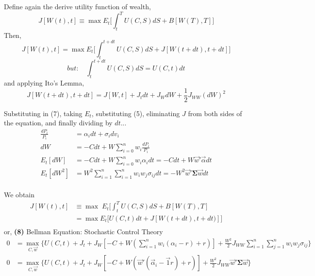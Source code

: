 \documentclass[
14pt,notheorems,hyperref={pdfauthor=whatever}
]{beamer}
\begin{document}
\begin{frame}
Define again the derive utility function of wealth,
\begin{equation} \tag{6}
    J[W(t),t] \equiv \max E_t \Bigg[ \int_t^T U(C,S)dS + B[W(T),T] \Bigg]
\end{equation}
Then,
\begin{equation} \tag{7}
    J[W(t),t] = \max E_t \Bigg[ \int_t^{t+dt} U(C,S)dS + J[W(t+dt),t+dt] \Bigg]
\end{equation}
\[\textit{but:}\;\;\;\; \int_t^{t+dt} U(C,S)dS = U(C,t)dt\]
and applying Ito's Lemma,
\[ J[W(t+dt),t+dt] = J[W,t] + J_tdt + J_WdW + \frac{1}{2} J_{WW}(dW)^2\]
\end{frame}

\begin{frame}
Substituting in (7), taking $E_t$, substituting (5), eliminating $J$ from both sides of the equation, and finally dividing by $dt$...\\
\begin{align*}
    \frac{dP_i}{P_i} &= \alpha_i dt + \sigma_i dv_i\\
    dW &= -C dt + W\sum_{i=0}^n w_i \frac{dP_i}{P_i}\\
    E_t[dW] &= -C dt + W \sum_{i=0}^n w_i\alpha_i dt = -C dt + W \vec{w}'\vec{\alpha} dt\\
    E_t[dW^2] &= W^2 \sum_{i=1}^n \sum_{i=1}^n w_i w_j \sigma_{ij} dt = -W^2 \vec{w}'\bm{\Sigma}\vec{w} dt\\
\end{align*}
\end{frame}

\begin{frame}
We obtain
\begin{align*}
    J[W(t),t] &\equiv \max\;E_t \Bigg[ \int_t^T U(C,S)dS + B[W(T),T]\\
    &= \max E_t \Bigg[U(C,t)dt + J[W(t+dt),t+dt)]\Bigg]\\
\end{align*}
or, \textbf{(8)} Bellman Equation: Stochastic Control Theory\\
\begin{align*}
    0 &= \max_{C,\vec{w}} \Bigg\{ U(C,t)+J_t+J_W[-C+W(\sum_{i=1}^n w_i(\alpha_i-r)+r)] + \frac{W^2}{2} J_{WW} \sum_{i=1}^n \sum_{j=1}^n w_i w_j \sigma_{ij} \Bigg\}\\
    0 &= \max_{C,\vec{w}} \Bigg\{ U(C,t)+J_t+J_W[-C+W(\vec{w}'(\vec{\alpha}_i-\vec{1}r)+r)] + \frac{W^2}{2} J_{WW} \vec{w}' \bm{\Sigma} \vec{w} \Bigg\}\\
\end{align*}
\end{frame}
\end{document}
